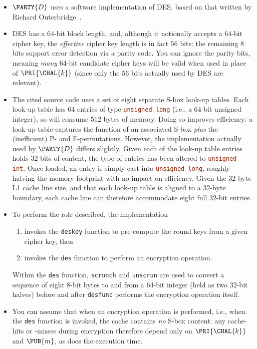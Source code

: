 \documentclass[crop={false},multi={true},tikz={true}]{standalone}
\begin{document}
\begin{itemize}
\item $\PARTY{D}$ uses a software implementation of DES, based on that
      written by Richard Outerbridge~\cite[Part V]{SCALE:Schneier:06}.
\item DES has a $64$-bit block length, and, although it notionally accepts 
      a $64$-bit cipher key, the {\em effective} cipher key length is in
      fact $56$ bits: the remaining $8$ bits support error detection via 
      a parity code.  You can ignore the parity bits, meaning {\em many}
      $64$-bit candidate cipher keys will be valid when used in place of 
      $\PRI{\CHAL{k}}$ (since only the $56$ bits actually used by DES are 
      relevant).
\item The cited source code uses a set of eight separate S-box look-up 
      tables.  Each look-up table has $64$ entries of type 
      \lstinline[language=C]{unsigned long} 
      (i.e., a $64$-bit unsigned integer), so will consume $512$ bytes 
      of memory.  Doing so improves efficiency: a look-up table captures 
      the function of an associated S-box {\em plus} the (inefficient) 
      P- and E-permutations.  However, the implementation actually used 
      by $\PARTY{D}$ differs slightly.  Given each of the look-up table 
      entries holds $32$ bits of content, the type of entries has been 
      altered to 
      \lstinline[language=C]{unsigned int}. 
      Once loaded, an entry is simply cast into 
      \lstinline[language=C]{unsigned long},
      roughly halving the memory footprint with no impact on efficiency.
      Given the $32$-byte L1 cache line size, and that each look-up table 
      is aligned to a $32$-byte boundary, each cache line can therefore 
      accommodate eight full $32$-bit entries.
\item To perform the role described, the implementation

      \begin{enumerate}
      \item invokes the \lstinline[language=C]{deskey} function
            to pre-compute the round keys from a given cipher key,
            then
      \item invokes the \lstinline[language=C]{des}    function
            to perform an encryption operation.
      \end{enumerate}

      \noindent
      Within the 
      \lstinline[language=C]{des}
      function, 
      \lstinline[language=C]{scrunch} and \lstinline[language=C]{unscrun}
      are used to convert a sequence of eight $8$-bit bytes to and from a
      $64$-bit integer (held as two $32$-bit halves) before and after 
      \lstinline[language=C]{desfunc}
      performs the encryption operation itself.
\item You can assume that when an encryption operation is performed, i.e.,
      when the
      \lstinline[language=C]{des}
      function is invoked, the cache contains {\em no} S-box content: any
      cache-hits or -misses during encryption therefore depend only on 
      $\PRI{\CHAL{k}}$ and $\PUB{m}$, as does the execution time.
\end{itemize}
\end{document}
